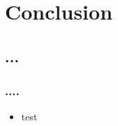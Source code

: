 \section{Conclusion}
	\subsection{...}
	
		\begin{frame}
			\frametitle{....}
			\begin{itemize}
				\item test
			\end{itemize}
		\end{frame}

